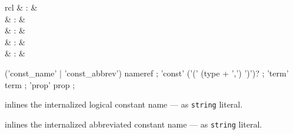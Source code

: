 \begin{isabellebody}
\begin{isamarkuptext}
\begin{description}
  \end{description}%
\end{isamarkuptext}%
\isamarkuptrue%
%
\endisatagmlref
{\isafoldmlref}%
%
\isadelimmlref
%
\endisadelimmlref
%
\isadelimmlantiq
%
\endisadelimmlantiq
%
\isatagmlantiq
%
\begin{isamarkuptext}%
\begin{matharray}{rcl}
  \hypertarget{ML antiquotation.const-name}{\hyperlink{ML antiquotation.const-name}{\mbox{}}} & : &  \\
  \hypertarget{ML antiquotation.const-abbrev}{\hyperlink{ML antiquotation.const-abbrev}{\mbox{}}} & : &  \\
  \hypertarget{ML antiquotation.const}{\hyperlink{ML antiquotation.const}{\mbox{}}} & : &  \\
  \hypertarget{ML antiquotation.term}{\hyperlink{ML antiquotation.term}{\mbox{}}} & : &  \\
  \hypertarget{ML antiquotation.prop}{\hyperlink{ML antiquotation.prop}{\mbox{}}} & : &  \\
  \end{matharray}

  \begin{rail}
  ('const_name' | 'const_abbrev') nameref
  ;
  'const' ('(' (type + ',') ')')?
  ;
  'term' term
  ;
  'prop' prop
  ;
  \end{rail}

  \begin{description}

  \item {} inlines the internalized logical
  constant name  --- as \verb|string| literal.

  \item {} inlines the internalized
  abbreviated constant name  --- as \verb|string|
  literal.


\end{description}
\end{isamarkuptext}
\end{isabellebody}

